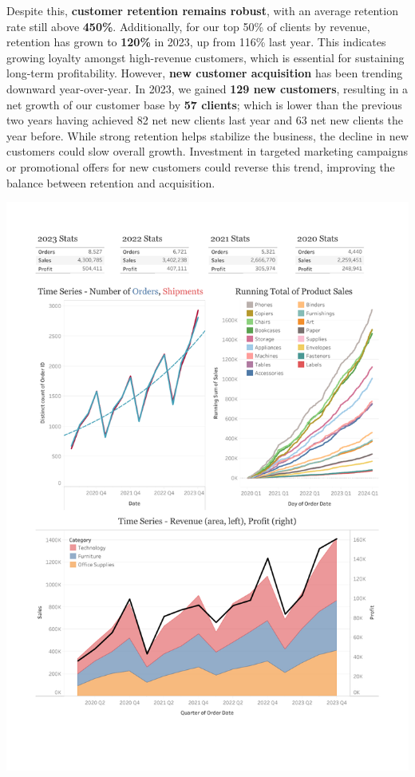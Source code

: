 \documentclass[12pt,a4paper]{article}
\begin{document}
Despite this, \textbf{customer retention remains robust}, with an average retention rate still above \textbf{450\%}. Additionally, for our top 50\% of clients by revenue, retention has grown to \textbf{120\%} in 2023, up from 116\% last year. This indicates growing loyalty amongst high-revenue customers, which is essential for sustaining long-term profitability. However, \textbf{new customer acquisition} has been trending downward year-over-year. In 2023, we gained \textbf{129 new customers}, resulting in a net growth of our customer base by \textbf{57 clients}; which is lower than the previous two years having achieved 82 net new clients last year and 63 net new clients the year before. While strong retention helps stabilize the business, the decline in new customers could slow overall growth. Investment in targeted marketing campaigns or promotional offers for new customers could reverse this trend, improving the balance between retention and acquisition.

\vspace*{-0.5cm} %

\noindent
\includegraphics[width=\paperwidth,height=\paperheight,keepaspectratio]{Dashboard4.pdf}
\end{document}
